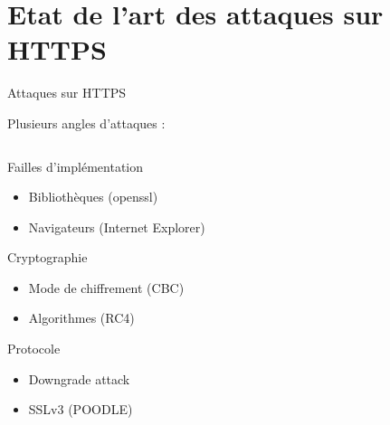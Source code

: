 \section{Etat de l'art des attaques sur HTTPS}


\begin{frame}{Attaques sur HTTPS}

  {\Large \centerline{Plusieurs angles d'attaques :}}

  \begin{columns}
    \begin{column}{0.5\textwidth}
      \begin{exampleblock}{Failles d'implémentation}
        \begin{itemize}
        \item Bibliothèques (openssl)
        \item Navigateurs (Internet Explorer)
        \end{itemize}
      \end{exampleblock}

      \begin{exampleblock}{Cryptographie}
        \begin{itemize}
        \item Mode de chiffrement (CBC)
        \item Algorithmes (RC4)
        \end{itemize}
      \end{exampleblock}

      \begin{exampleblock}{Protocole}
        \begin{itemize}
        \item{Downgrade attack}
        \item{SSLv3 (POODLE)}
        \end{itemize}
      \end{exampleblock}
    \end{column}


\end{columns}
\end{frame}
